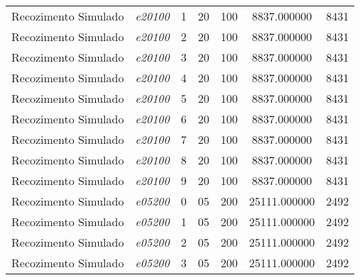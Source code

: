 {\begin{longtable}{cc|c|cc|cc}
			Recozimento Simulado & \textit{e20100}    & 1                               & 20               & 100              & 8837.000000                          & 8431 \\ 
			Recozimento Simulado & \textit{e20100}    & 2                               & 20               & 100              & 8837.000000                          & 8431 \\ 
			Recozimento Simulado & \textit{e20100}    & 3                               & 20               & 100              & 8837.000000                          & 8431 \\ 
			Recozimento Simulado & \textit{e20100}    & 4                               & 20               & 100              & 8837.000000                          & 8431 \\ 
			Recozimento Simulado & \textit{e20100}    & 5                               & 20               & 100              & 8837.000000                          & 8431 \\ 
			Recozimento Simulado & \textit{e20100}    & 6                               & 20               & 100              & 8837.000000                          & 8431 \\ 
			Recozimento Simulado & \textit{e20100}    & 7                               & 20               & 100              & 8837.000000                          & 8431 \\ 
			Recozimento Simulado & \textit{e20100}    & 8                               & 20               & 100              & 8837.000000                          & 8431 \\ 
			Recozimento Simulado & \textit{e20100}    & 9                               & 20               & 100              & 8837.000000                          & 8431 \\ \hline
			Recozimento Simulado & \textit{e05200}    & 0                               & 05               & 200              & 25111.000000                          & 2492 \\ 
			Recozimento Simulado & \textit{e05200}    & 1                               & 05               & 200              & 25111.000000                          & 2492 \\ 
			Recozimento Simulado & \textit{e05200}    & 2                               & 05               & 200              & 25111.000000                          & 2492 \\ 
			Recozimento Simulado & \textit{e05200}    & 3                               & 05               & 200              & 25111.000000                          & 2492 \\ 

\end{longtable}}
